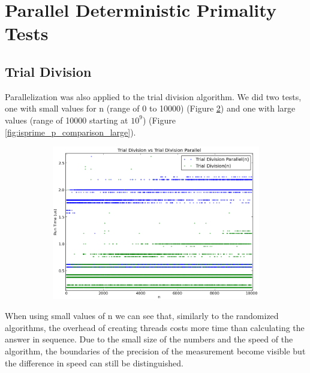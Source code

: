 \documentclass[compressed,final,notitlepage,narroweqnarray,inline,twoside,]{ieee}
\begin{document}
\section{Parallel Deterministic Primality Tests}
\subsection{Trial Division}
Parallelization was also applied to the trial division algorithm. We did two tests, one with small values for n (range of 0 to 10000) (Figure \ref{fig:isprime_p_comparison_small}) and one with large values (range of 10000 starting at $10^9$) (Figure \ref{fig:isprime_p_comparison_large}).
\begin{figure}
        \centering
        \begin{subfigure}[b]{0.524\textwidth}
                \includegraphics[width=\textwidth]{../images/isPrime_par_comparison_small}
                \label{fig:gull}
        \end{subfigure}
        \vspace{-30pt}\caption{}\label{fig:isprime_p_comparison_small}
\end{figure}
When using small values of n we can see that, similarly to the randomized algorithms, the overhead of creating threads costs more time than calculating the answer in sequence. Due to the small size of the numbers and the speed of the algorithm, the boundaries of the precision of the measurement become visible but the difference in speed can still be distinguished.
\end{document}
